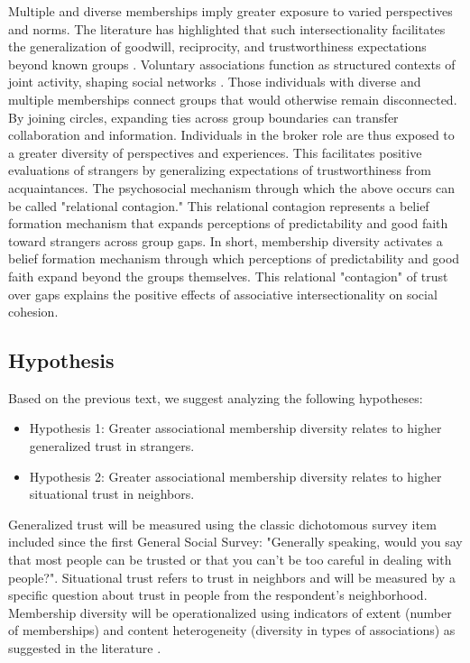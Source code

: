 \bigskip

Multiple and diverse memberships imply greater exposure to varied perspectives and norms. The literature has highlighted that such intersectionality facilitates the generalization of goodwill, reciprocity, and trustworthiness expectations beyond known groups \parencite{paxton_association_2007, putnam_bowling_2000}. Voluntary associations function as structured contexts of joint activity, shaping social networks \parencite{mcpherson_hypernetwork_1982}. Those individuals with diverse and multiple memberships connect groups that would otherwise remain disconnected. By joining circles, expanding ties across group boundaries can transfer collaboration and information. Individuals in the broker role are thus exposed to a greater diversity of perspectives and experiences. This facilitates positive evaluations of strangers by generalizing expectations of trustworthiness from acquaintances. The psychosocial mechanism through which the above occurs can be called "relational contagion." This relational contagion represents a belief formation mechanism that expands perceptions of predictability and good faith toward strangers across group gaps. In short, membership diversity activates a belief formation mechanism \parencite{hedstrom_dissecting_2005} through which perceptions of predictability and good faith expand beyond the groups themselves. This relational "contagion" of trust over gaps explains the positive effects of associative intersectionality on social cohesion.

\subsection{Hypothesis}

Based on the previous text, we suggest analyzing the following hypotheses:

\begin{itemize}

\item Hypothesis 1: Greater associational membership diversity relates to higher generalized trust in strangers.

\item Hypothesis 2: Greater associational membership diversity relates to higher situational trust in neighbors.
\end{itemize}

Generalized trust will be measured using the classic dichotomous survey item included since the first General Social Survey: "Generally speaking, would you say that most people can be trusted or that you can't be too careful in dealing with people?". Situational trust refers to trust in neighbors and will be measured by a specific question about trust in people from the respondent's neighborhood. Membership diversity will be operationalized using indicators of extent (number of memberships) and content heterogeneity (diversity in types of associations) as suggested in the literature \parencite{paxton_association_2007, paxton_is_2015}.


